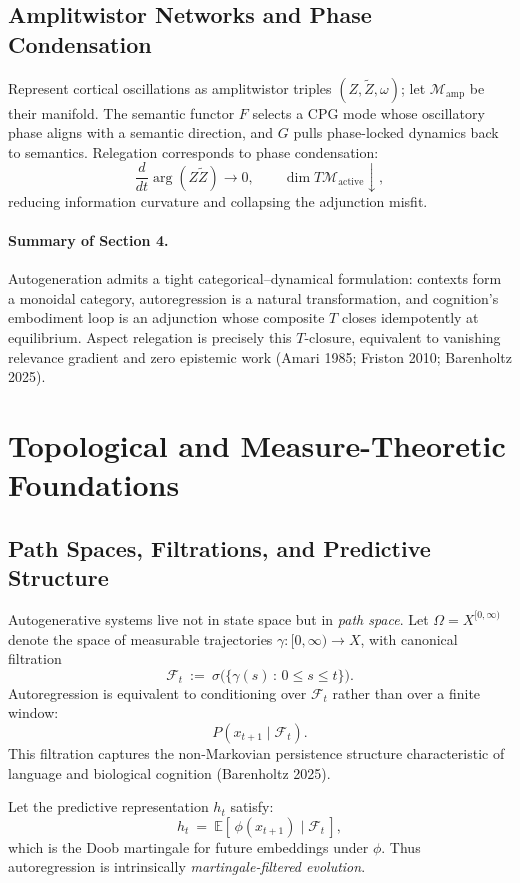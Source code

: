 \documentclass[12pt,a4paper,twoside,openright]{book}
\begin{document}
\subsection{Amplitwistor Networks and Phase Condensation}
Represent cortical oscillations as amplitwistor triples $(Z,\tilde Z,\omega)$; let $\mathcal{M}_{\mathrm{amp}}$ be their manifold. The semantic functor $F$ selects a CPG mode whose oscillatory phase aligns with a semantic direction, and $G$ pulls phase-locked dynamics back to semantics. Relegation corresponds to phase condensation:
\[
\frac{d}{dt}\arg(Z\tilde Z)\to 0,\qquad \dim T\mathcal{M}_{\mathrm{active}}\downarrow,
\]
reducing information curvature and collapsing the adjunction misfit.

\paragraph{Summary of Section 4.}
Autogeneration admits a tight categorical–dynamical formulation: contexts form a monoidal category, autoregression is a natural transformation, and cognition’s embodiment loop is an adjunction whose composite $T$ closes idempotently at equilibrium. Aspect relegation is precisely this $T$-closure, equivalent to vanishing relevance gradient and zero epistemic work (Amari 1985; Friston 2010; Barenholtz 2025).

\section{Topological and Measure-Theoretic Foundations}
\subsection{Path Spaces, Filtrations, and Predictive Structure}
Autogenerative systems live not in state space but in \emph{path space}.
Let $\Omega = X^{[0,\infty)}$ denote the space of measurable trajectories $\gamma : [0,\infty)\to X$, with canonical filtration
\[
\mathcal{F}_t \ :=\ \sigma\!\big(\{\gamma(s)\,:\,0\le s\le t\}\big).
\]
Autoregression is equivalent to conditioning over $\mathcal{F}_t$ rather than over a finite window:
\[
P(x_{t+1} \mid \mathcal{F}_t).
\]
This filtration captures the non-Markovian persistence structure characteristic of language and biological cognition (Barenholtz 2025).

Let the predictive representation $h_t$ satisfy:
\[
h_t\ =\ \mathbb{E}[\,\phi(x_{t+1}) \mid \mathcal{F}_t\,],
\]
which is the Doob martingale for future embeddings under $\phi$.
Thus autoregression is intrinsically \emph{martingale-filtered evolution}.
\end{document}

